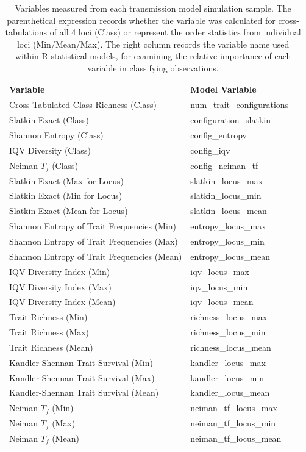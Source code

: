 \begin{table}[ht]
\begin{tabular}{lll}
\hline
Variable                                    & Model Variable \\ 
\hline
Cross-Tabulated Class Richness  (Class)         &  num\_trait\_configurations      \\
Slatkin Exact (Class)           & configuration\_slatkin       \\
Shannon Entropy (Class)  &  config\_entropy \\
IQV Diversity (Class)  & config\_iqv \\
Neiman $T_f$ (Class) & config\_neiman\_tf \\
Slatkin Exact (Max for Locus)                    & slatkin\_locus\_max       \\
Slatkin Exact (Min for Locus)                     & slatkin\_locus\_min      \\
Slatkin Exact (Mean for Locus)                   & slatkin\_locus\_mean       \\
Shannon Entropy of Trait Frequencies (Min)      & entropy\_locus\_max       \\
Shannon Entropy of Trait Frequencies (Max)       & entropy\_locus\_min      \\
Shannon Entropy of Trait Frequencies (Mean)      & entropy\_locus\_mean      \\
IQV Diversity Index (Min)     & iqv\_locus\_max \\
IQV Diversity Index (Max)     & iqv\_locus\_min \\
IQV Diversity Index (Mean)    & iqv\_locus\_mean \\
Trait Richness (Min)   & richness\_locus\_max \\ 
Trait Richness (Max)   & richness\_locus\_min \\
Trait Richness (Mean)    & richness\_locus\_mean \\
Kandler-Shennan Trait Survival (Min)   & kandler\_locus\_max \\
Kandler-Shennan Trait Survival (Max)   & kandler\_locus\_min \\
Kandler-Shennan Trait Survival (Mean)   & kandler\_locus\_mean \\
Neiman $T_f$ (Min)   & neiman\_tf\_locus\_max \\
Neiman $T_f$ (Max)   & neiman\_tf\_locus\_min \\
Neiman $T_f$ (Mean)   & neiman\_tf\_locus\_mean \\
\hline

\end{tabular}

\caption{Variables measured from each transmission model simulation sample.  The parenthetical expression records whether the variable was calculated for cross-tabulations of all 4 loci (Class) or represent the order statistics from individual loci (Min/Mean/Max).  The right column records the variable name used within R statistical models, for examining the relative importance of each variable in classifying observations.}
\label{tab:variables}
\end{table}

